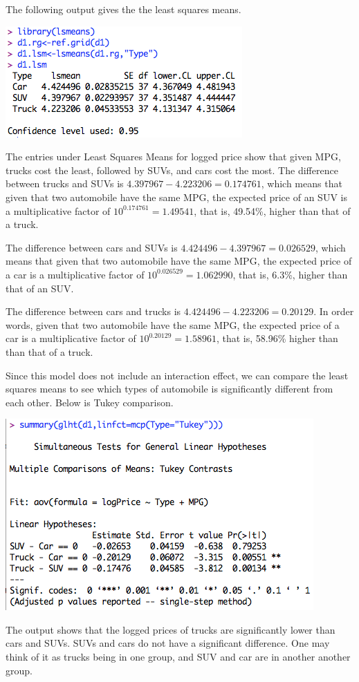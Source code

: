 \documentclass[a4 paper, 11 pt]{article}
\begin{document}
The following output gives the the least squares means.
\begin{center}
\includegraphics[scale=0.55]{d1lsm}
\end{center}
The entries under Least Squares Means for logged price show that given MPG, trucks cost the least, followed by SUVs, and cars cost the most. The difference between trucks and SUVs is $4.397967 - 4.223206 = 0.174761$, which means that given that two automobile have the same MPG, the expected price of an SUV is a multiplicative factor of $10^{0.174761} = 1.49541$, that is, 49.54\%, higher than that of a truck.

The difference between cars and SUVs is $4.424496 - 4.397967 = 0.026529$, which means that given that two automobile have the same MPG, the expected price of a car is a multiplicative factor of $10^{0.026529} = 1.062990$, that is, 6.3\%, higher than that of an SUV.

The difference between cars and trucks is $4.424496 - 4.223206 = 0.20129$. In order words, given that two automobile have the same MPG, the expected price of a car is a multiplicative factor of $10^{0.20129} = 1.58961$, that is, 58.96\% higher than than that of a truck.

Since this model does not include an interaction effect, we can compare the least squares means to see which types of automobile is significantly different from each other. Below is Tukey comparison.
\begin{center}
\includegraphics[scale=0.5]{d1tukey}
\end{center}
The output shows that the logged prices of trucks are significantly lower than cars and SUVs. SUVs and cars do not have a significant difference. One may think of it as trucks being in one group, and SUV and car are in another another group.
\end{document}
